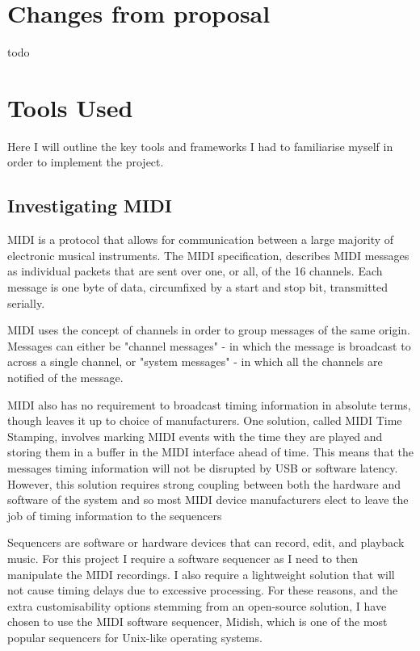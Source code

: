 \documentclass[12pt,twoside,notitlepage]{report}
\begin{document}
	\section{Changes from proposal}
	todo
	\section{Tools Used}
	Here I will outline the key tools and frameworks I had to familiarise myself in order to implement the project.
		\subsection{\label{Midi}Investigating MIDI}
		MIDI is a protocol that allows for communication between a large majority of electronic musical instruments. The MIDI specification\cite{MIDI}, describes MIDI messages as individual packets that are sent over one, or all, of the 16 channels. Each message is one byte of data, circumfixed by a start and stop bit, transmitted serially. 		
	

		MIDI uses the concept of channels in order to group messages of the same origin. Messages can either be "channel messages" - in which the message is broadcast to across a single channel, or "system messages" - in which all the channels are notified of the message.
		
		MIDI also has no requirement to broadcast timing information in absolute terms, though leaves it up to choice of manufacturers. One solution, called MIDI Time Stamping\cite{Walker2007}, involves marking MIDI events with the time they are played and storing them in a buffer in the MIDI interface ahead of time. This means that the messages timing information will not be disrupted by USB or software latency. However, this solution requires strong coupling between both the hardware and software of the system and so most MIDI device manufacturers elect to leave the job of timing information to the sequencers
		
		Sequencers are software or hardware devices that can record, edit, and playback music. For this project I require a software sequencer as I need to then manipulate the MIDI recordings. I also require a lightweight solution that will not cause timing delays due to excessive processing. For these reasons, and the extra customisability options stemming from an open-source solution, I have chosen to use the MIDI software sequencer, Midish\footnotemark {}, which is one of the most popular sequencers for Unix-like operating systems.
		
\end{document}
